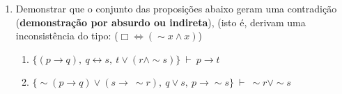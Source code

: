 \documentclass[12pt, a4paper,final]{article}
\begin{document}
\begin{enumerate}
\begin{enumerate}
 











\end{enumerate}


\item  Demonstrar que o conjunto das proposi\c c\~oes abaixo geram uma contradi\c c\~ao ({\bf demons\-tra\c c\~ao por absurdo ou indireta}),  (isto \'e, derivam uma inconsist\^encia do tipo: ($\Box \Leftrightarrow (\sim x \wedge x)$)

\begin{enumerate}


\item $\{ ( p \rightarrow q), ~ q \leftrightarrow s,~ t\vee (r \wedge \sim s) \} ~\vdash~  p \rightarrow t $



\item $\{ \sim (p \rightarrow q) \vee ( s  \rightarrow ~ \sim r),~ q\vee s,~ p \rightarrow \sim s  \} ~\vdash~  \sim r \vee \sim s $


\end{enumerate}
\end{enumerate}
\end{document}
